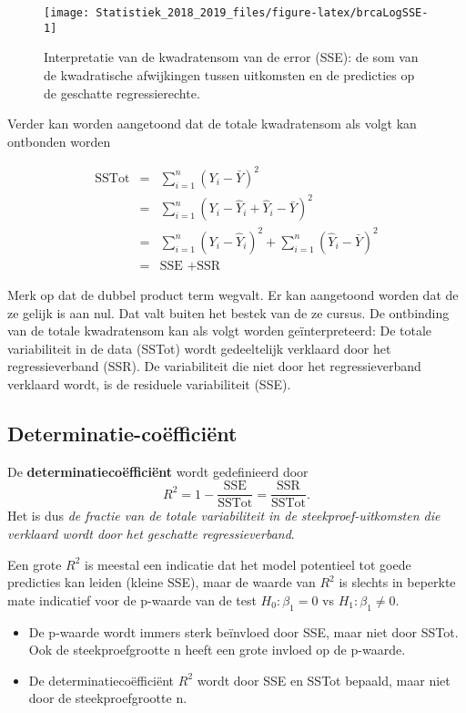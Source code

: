 \documentclass[12pt,dutch,coursenotes]{book}
\providecommand{\tightlist}{%
  \setlength{\itemsep}{0pt}\setlength{\parskip}{0pt}}
\theoremstyle{definition}
\theoremstyle{definition}
\theoremstyle{definition}
\theoremstyle{remark}
\begin{document}
\begin{figure}

{\centering \texttt{[image: Statistiek\_2018\_2019\_files/figure-latex/brcaLogSSE-1]} 

}

\caption{Interpretatie van de kwadratensom van de error (SSE): de som van de kwadratische afwijkingen tussen uitkomsten en de predicties op de geschatte regressierechte.}\label{fig:brcaLogSSE}
\end{figure}

Verder kan worden aangetoond dat de totale kwadratensom als volgt kan
ontbonden worden

\begin{eqnarray*}
  \text{SSTot} 
    &=&  \sum_{i=1}^n (Y_i-\bar{Y})^2 \\
    &=&  \sum_{i=1}^n (Y_i-\hat{Y}_i+\hat{Y}_i-\bar{Y})^2 \\
    &=&  \sum_{i=1}^n (Y_i-\hat{Y}_i)^2+\sum_{i=1}^n(\hat{Y}_i-\bar{Y})^2 \\
    &=&  \text{SSE }+\text{SSR}  
  \end{eqnarray*}

Merk op dat de dubbel product term wegvalt. Er kan aangetoond worden dat
de ze gelijk is aan nul. Dat valt buiten het bestek van de ze cursus. De
ontbinding van de totale kwadratensom kan als volgt worden
geïnterpreteerd: De totale variabiliteit in de data (SSTot) wordt
gedeeltelijk verklaard door het regressieverband (SSR). De variabiliteit
die niet door het regressieverband verklaard wordt, is de residuele
variabiliteit (SSE).

\subsection{Determinatie-coëfficiënt}\label{determinatie-coefficient}

De \textbf{determinatiecoëfficiënt} wordt gedefinieerd door
\[ R^2 = 1-\frac{\text{SSE}}{\text{SSTot}}=\frac{\text{SSR}}{\text{SSTot}}.\]
Het is dus \emph{de fractie van de totale variabiliteit in de
steekproef-uitkomsten die verklaard wordt door het geschatte
regressieverband}.

Een grote \(R^2\) is meestal een indicatie dat het model potentieel tot
goede predicties kan leiden (kleine SSE), maar de waarde van \(R^2\) is
slechts in beperkte mate indicatief voor de p-waarde van de test
\(H_0:\beta_1=0\) vs \(H_1:\beta_1\neq0\).

\begin{itemize}
\tightlist
\item
  De p-waarde wordt immers sterk beïnvloed door SSE, maar niet door
  SSTot. Ook de steekproefgrootte n heeft een grote invloed op de
  p-waarde.
\item
  De determinatiecoëfficiënt \(R^2\) wordt door SSE en SSTot bepaald,
  maar niet door de steekproefgrootte n.
\end{itemize}
\end{document}
